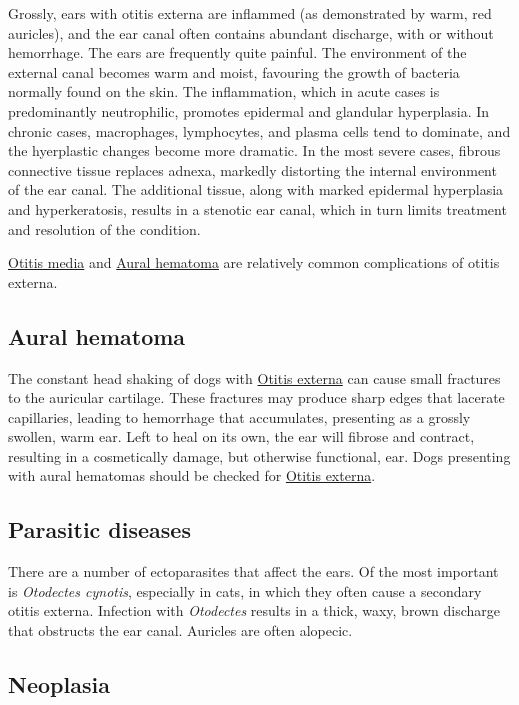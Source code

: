 \documentclass[openany]{book}
\begin{document}
Grossly, ears with otitis externa are inflammed (as demonstrated by
warm, red auricles), and the ear canal often contains abundant
discharge, with or without hemorrhage. The ears are frequently quite
painful. The environment of the external canal becomes warm and moist,
favouring the growth of bacteria normally found on the skin. The
inflammation, which in acute cases is predominantly neutrophilic,
promotes epidermal and glandular hyperplasia. In chronic cases,
macrophages, lymphocytes, and plasma cells tend to dominate, and the
hyerplastic changes become more dramatic. In the most severe cases,
fibrous connective tissue replaces adnexa, markedly distorting the
internal environment of the ear canal. The additional tissue, along with
marked epidermal hyperplasia and hyperkeratosis, results in a stenotic
ear canal, which in turn limits treatment and resolution of the
condition.

\protect\hyperlink{otitis-media}{Otitis media} and
\protect\hyperlink{aural-hematoma}{Aural hematoma} are relatively common
complications of otitis externa.

\hypertarget{aural-hematoma}{\subsection{Aural
hematoma}\label{aural-hematoma}}

The constant head shaking of dogs with
\protect\hyperlink{otitis-externa}{Otitis externa} can cause small
fractures to the auricular cartilage. These fractures may produce sharp
edges that lacerate capillaries, leading to hemorrhage that accumulates,
presenting as a grossly swollen, warm ear. Left to heal on its own, the
ear will fibrose and contract, resulting in a cosmetically damage, but
otherwise functional, ear. Dogs presenting with aural hematomas should
be checked for \protect\hyperlink{otitis-externa}{Otitis externa}.

\subsection{Parasitic diseases}\label{parasitic-diseases}

There are a number of ectoparasites that affect the ears. Of the most
important is \emph{Otodectes cynotis}, especially in cats, in which they
often cause a secondary otitis externa. Infection with \emph{Otodectes}
results in a thick, waxy, brown discharge that obstructs the ear canal.
Auricles are often alopecic.

\subsection{Neoplasia}\label{neoplasia}
\end{document}
